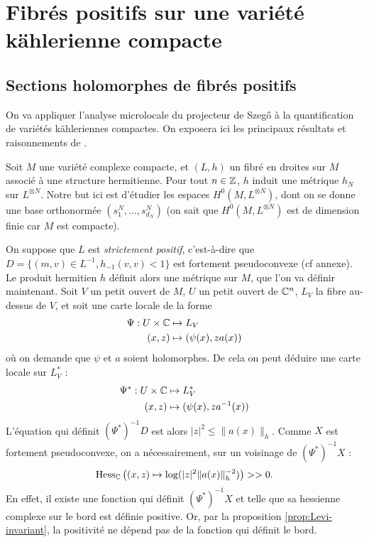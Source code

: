 \section{Fibrés positifs sur une variété kählerienne compacte}

\subsection{Sections holomorphes de fibrés positifs}

On va appliquer l'analyse microlocale du projecteur de Szeg\H{o} à la quantification de variétés kähleriennes compactes. On exposera ici les principaux résultats et raisonnements de \cite{Zelditch2000}.

Soit $M$ une variété complexe compacte, et $(L,h)$ un fibré en droites sur $M$ associé à une structure hermitienne. Pour tout $n \in \mathbb{Z}$, $h$ induit une métrique $h_N$ sur $L^{\otimes N}$. Notre but ici est d'étudier les espaces $H^0(M,L^{\otimes N})$, dont on se donne une base orthonormée $(s^N_1, \ldots, s^N_{d_N})$ (on sait que $H^0(M,L^{\otimes N})$ est de dimension finie car $M$ est compacte).

On suppose que $L$ est \emph{strictement positif}, c'est-à-dire que $D=\{(m,v) \in L^{-1}, h_{-1}(v,v) < 1\}$ est fortement pseudoconvexe (cf annexe). Le produit hermitien $h$ définit alors une métrique sur $M$, que l'on va définir maintenant. Soit $V$ un petit ouvert de $M$, $U$ un petit ouvert de $\mathbb{C}^n$, $L_V$ la fibre au-dessus de $V$, et soit une carte locale de la forme
\begin{align*}
	\Psi : U \times \mathbb{C} &\mapsto L_V\\
	(x,z) &\mapsto (\psi(x),za(x))
\end{align*}
où on demande que $\psi$ et $a$ soient holomorphes. De cela on peut déduire une carte locale sur $L^*_V$ :
\begin{align*}
	\Psi^* : U \times \mathbb{C} &\mapsto L^*_V\\
	(x,z) &\mapsto (\psi(x),za^{-1}(x))
\end{align*}
L'équation qui définit $(\Psi^*)^{-1}D$ est alors $|z|^2\leq\|a(x)\|_h$. Comme $X$ est fortement pseudoconvexe, on a nécessairement, sur un voisinage de $(\Psi^*)^{-1}X$ : 
\begin{equation*}
	\operatorname{Hess}_{\mathbb{C}} \left((x,z) \mapsto \log(|z|^2\|a(x)\|_h^{-2}) \right) >>0.
\end{equation*} En effet, il existe une fonction qui définit $(\Psi^*)^{-1}X$ et telle que sa hessienne complexe sur le bord est définie positive. Or, par la proposition \ref{prop:Levi-invariant}, la positivité ne dépend pas de la fonction qui définit le bord.

